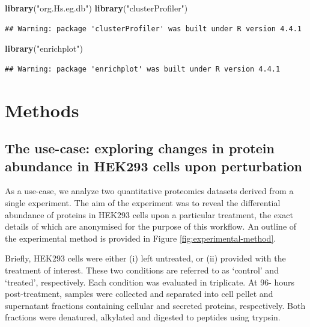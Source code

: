 \documentclass[9pt,a4paper,]{extarticle}
\newenvironment{Shaded}{\begin{snugshade}}{\end{snugshade}}
\newcommand{\FunctionTok}[1]{\textcolor[rgb]{0.13,0.29,0.53}{\textbf{#1}}}
\newcommand{\NormalTok}[1]{#1}
\newcommand{\StringTok}[1]{\textcolor[rgb]{0.31,0.60,0.02}{#1}}
\begin{document}
\begin{Shaded}
\begin{Highlighting}[]
\FunctionTok{library}\NormalTok{(}\StringTok{"org.Hs.eg.db"}\NormalTok{)}
\FunctionTok{library}\NormalTok{(}\StringTok{"clusterProfiler"}\NormalTok{)}
\end{Highlighting}
\end{Shaded}

\begin{verbatim}
## Warning: package 'clusterProfiler' was built under R version 4.4.1
\end{verbatim}

\begin{Shaded}
\begin{Highlighting}[]
\FunctionTok{library}\NormalTok{(}\StringTok{"enrichplot"}\NormalTok{)}
\end{Highlighting}
\end{Shaded}

\begin{verbatim}
## Warning: package 'enrichplot' was built under R version 4.4.1
\end{verbatim}

\section{Methods}\label{methods}

\subsection{The use-case: exploring changes in protein abundance in HEK293 cells upon perturbation}\label{the-use-case-exploring-changes-in-protein-abundance-in-hek293-cells-upon-perturbation}

As a use-case, we analyze two quantitative proteomics datasets derived from a
single experiment. The aim of the experiment was to reveal the differential
abundance of proteins in HEK293 cells upon a particular treatment, the exact
details of which are anonymised for the purpose of this workflow. An outline of
the experimental method is provided in Figure \ref{fig:experimental-method}.

Briefly, HEK293 cells were either (i) left untreated, or (ii) provided with the
treatment of interest. These two conditions are referred to as `control' and
`treated', respectively. Each condition was evaluated in triplicate. At 96-
hours post-treatment, samples were collected and separated into cell pellet and
supernatant fractions containing cellular and secreted proteins, respectively.
Both fractions were denatured, alkylated and digested to peptides using trypsin.
\end{document}
